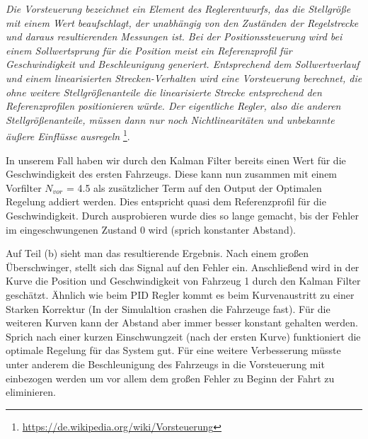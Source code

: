 \textit{Die Vorsteuerung bezeichnet ein Element des Reglerentwurfs, das die
    Stellgröße mit einem Wert beaufschlagt, der unabhängig von den Zuständen der
    Regelstrecke und daraus resultierenden Messungen ist. Bei der
    Positionssteuerung wird bei einem Sollwertsprung für die Position meist ein
    Referenzprofil für Geschwindigkeit und Beschleunigung generiert.
    Entsprechend dem Sollwertverlauf und einem linearisierten Strecken-Verhalten
    wird eine Vorsteuerung berechnet, die ohne weitere Stellgrößenanteile die
    linearisierte Strecke entsprechend den Referenzprofilen positionieren würde.
Der eigentliche Regler, also die anderen Stellgrößenanteile, müssen dann nur
noch Nichtlinearitäten und unbekannte äußere Einflüsse ausregeln}
\footnote{\url{https://de.wikipedia.org/wiki/Vorsteuerung}}.

In unserem Fall haben wir durch den Kalman Filter bereits einen Wert für die
Geschwindigkeit des ersten Fahrzeugs. Diese kann nun zusammen mit einem
Vorfilter $N_{vor}$ = 4.5 als zusätzlicher Term auf den Output der Optimalen
Regelung addiert werden. Dies entspricht quasi dem Referenzprofil für die
Geschwindigkeit. Durch ausprobieren wurde dies so lange gemacht, bis der Fehler
im eingeschwungenen Zustand 0 wird (sprich konstanter Abstand).

Auf Teil (b) sieht man das resultierende Ergebnis. Nach einem großen
Überschwinger, stellt sich das Signal auf den Fehler ein. Anschließend wird in
der Kurve die Position und Geschwindigkeit von Fahrzeug 1 durch den Kalman
Filter geschätzt. Ähnlich wie beim PID Regler kommt es beim Kurvenaustritt zu
einer Starken Korrektur (In der Simulaltion crashen die Fahrzeuge fast). Für die
weiteren Kurven kann der Abstand aber immer besser konstant gehalten werden.
Sprich nach einer kurzen Einschwungzeit (nach der ersten Kurve) funktioniert die
optimale Regelung für das System gut. Für eine weitere Verbesserung müsste unter
anderem die Beschleunigung des Fahrzeugs in die Vorsteuerung mit einbezogen
werden um vor allem dem großen Fehler zu Beginn der Fahrt zu eliminieren.

